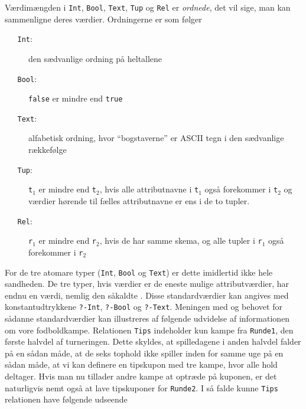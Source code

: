 V\ae{}rdim\ae{}ngden i \verb"Int", \verb"Bool", \verb"Text", \verb"Tup" og
\verb"Rel" er {\em ordnede}, det vil sige, man kan sammenligne deres
v\ae{}rdier. Ordningerne er som f\o{}lger
\begin{description}%
\item[{\tt ~~~Int}:] den s\ae{}dvanlige ordning p\aa{} heltallene
\item[{\tt ~~~Bool}:] \verb"false" er mindre end \verb"true"
\item[{\tt ~~~Text}:] alfabetisk ordning, hvor ``bogstaverne'' er ASCII tegn
i den s\ae{}dvanlige r\ae{}kkef\o{}lge
\item[{\tt ~~~Tup}:] {\tt t$_1$} er mindre end {\tt t$_2$}, hvis alle attributnavne
i {\tt t$_1$} ogs\aa{} forekommer i {\tt t$_2$} og v\ae{}rdier h\o{}rende
til f\ae{}lles attributnavne er ens i de to tupler. 
\item[{\tt ~~~Rel}:] {\tt r$_1$} er mindre end {\tt r$_2$}, hvis 
de har samme skema, og alle tupler i {\tt r$_1$} ogs\aa{} 
forekommer i {\tt r$_2$}
\end{description}
For de tre atomare typer (\verb"Int", \verb"Bool" og \verb"Text")
er dette imidlertid ikke hele sandheden. De tre typer, hvis
v\ae{}rdier er de eneste mulige attributv\ae{}rdier, har endnu en v\ae{}rdi,
nemlig den s\aa{}kaldte {\em {}}. Disse 
standardv\ae{}rdier kan angives
med konstantudtrykkene \verb"?-Int", \verb"?-Bool" og \verb"?-Text".
Meningen med og behovet for s\aa{}danne standardv\ae{}rdier kan
illustreres af f\o{}lgende udvidelse af informationen om vore
fodboldkampe. Relationen
\verb"Tips" indeholder kun kampe fra \verb"Runde1", den f\o{}rste halvdel af 
turneringen. Dette skyldes, at spilledagene i anden halvdel falder
p\aa{} en s\aa{}dan m\aa{}de, at de seks tophold ikke spiller
inden for samme uge p\aa{} en s\aa{}dan m\aa{}de, at vi kan
definere en tipskupon med tre kampe, hvor alle hold deltager.
Hvis man nu tillader andre kampe at optr\ae{}de p\aa{} kuponen, er det
naturligvis nemt ogs\aa{} at lave tipskuponer for \verb"Runde2".
I s\aa{} falde kunne \verb"Tips" relationen have f\o{}lgende udseende
\begin{center}
\end{center}
